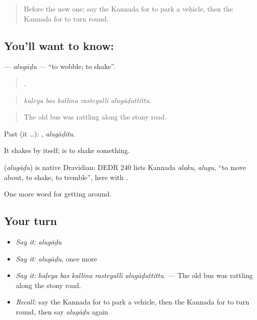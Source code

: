 \label{lesson:KA-C445-alugadu}



\begin{quote}
Before the new one: say the Kannada for to park a vehicle, then the Kannada for to turn round.
\end{quote}

\subsection*{You'll want to know: }
\textbf{} — \emph{alugāḍu} — \textquotedblleft{}to wobble; to shake\textquotedblright{}.

\begin{quote}
    .
\end{quote}

\begin{quote}
\emph{haḷeya bas kallina rasteyalli alugāḍuttittu.}
\end{quote}

\begin{quote}
The old bus was rattling along the stony road.
\end{quote}

Past (it …): , \emph{alugāḍitu}.

It shakes by itself;  is to shake something.

\begin{cousinweb}
\textbf{} (\emph{alugāḍu}) is native Dravidian: DEDR 240 lists Kannada \emph{alaku}, \emph{alugu}, \textquotedblleft{}to move about, to shake, to tremble\textquotedblright{}, here with .
\end{cousinweb}

\begin{grammarlens}[title={What you've built}]
One more word for getting around.
\end{grammarlens}

\subsection*{Your turn}
\begin{itemize}
\raggedright
  \item \emph{Say it:} \emph{alugāḍu}
  \item \emph{Say it:} \emph{alugāḍu}, once more
  \item \emph{Say it:} \emph{haḷeya bas kallina rasteyalli alugāḍuttittu.} — The old bus was rattling along the stony road.
  \item \emph{Recall:} say the Kannada for to park a vehicle, then the Kannada for to turn round, then say \emph{alugāḍu} again
\end{itemize}

